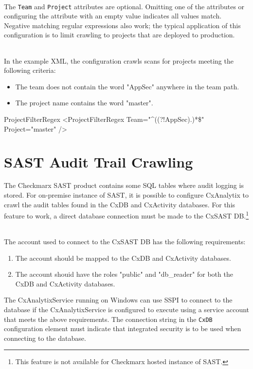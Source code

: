 \noindent\\The \texttt{Team} and \texttt{Project} attributes are optional.  Omitting one of the attributes or configuring the attribute with an empty
value indicates all values match.  Negative matching regular expressions also work; the typical application of this configuration is to limit crawling
to projects that are deployed to production.

\noindent\\In the example XML, the configuration crawls scans for projects meeting the following criteria:

\begin{itemize}
    \item The team does not contain the word "AppSec" anywhere in the team path.
    \item The project name contains the word "master".
\end{itemize}

\begin{xml}{ProjectFilterRegex}{}{}
<ProjectFilterRegex 
    Team="^((?!AppSec).)*\$" 
    Project="master"
    />
\end{xml}
    

\section{SAST Audit Trail Crawling}
The Checkmarx SAST product contains some SQL tables where audit logging is stored.  For on-premise instance of SAST, it is possible to
configure CxAnalytix to crawl the audit tables found in the CxDB and CxActivity databases.  For this feature 
to work, a direct database connection must be made to the CxSAST DB.\footnote{This feature is not available for Checkmarx hosted instance of SAST.}

\noindent\\The account used to connect to the CxSAST DB has the following requirements:

\begin{enumerate}
    \item The account should be mapped to the CxDB and CxActivity databases.
    \item The account shouid have the roles "public" and "db\_reader" for both the CxDB and CxActivity databases.
\end{enumerate}

The CxAnalytixService running on Windows can use SSPI to connect to the database if the CxAnalytixService is configured to execute using a 
service account that meets the above requirements.  The connection string in the \texttt{CxDB} configuration element must indicate that
integrated security is to be used when connecting to the database.



